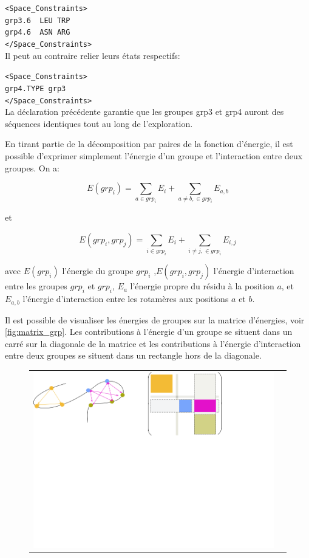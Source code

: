 \begin{enumerate}
\verb!<Space_Constraints>! \\
\verb!grp3.6  LEU TRP! \\
\verb!grp4.6  ASN ARG!  \\
\verb!</Space_Constraints>! \\

Il peut au contraire relier leurs états respectifs:

\verb!<Space_Constraints>! \\
\verb!grp4.TYPE grp3! \\
\verb!</Space_Constraints>! \\

La déclaration précédente garantie que les groupes grp3 et grp4 auront des séquences identiques tout au long de l'exploration. 

En tirant partie de la décomposition par paires de la fonction d'énergie, il est possible d'exprimer simplement l'énergie d'un groupe et l'interaction entre deux groupes. On a:

\begin{equation}
E(grp_i) = \sum_{a \in grp_i} E_i + \sum_{a \neq b, \in grp_i} E_{a,b}
\end{equation}

et

\begin{equation}
E(grp_i,grp_j) = \sum_{i \in grp_i} E_i + \sum_{i \neq j, \in grp_i} E_{i,j}
\end{equation}


avec $E(grp_i)$ l'énergie du groupe $grp_i$ ,$E(grp_i,grp_j)$ l'énergie d'interaction entre les groupes $grp_i$ et $grp_i$, $E_a$ l'énergie propre du résidu à la position $a$, et $E_{a,b}$ l'énergie d'interaction entre les rotamères aux positions $a$ et $b$.

Il est possible de visualiser les énergies de groupes sur la matrice d'énergies, voir \ref{fig:matrix_grp}. Les contributions à l'énergie d'un groupe se situent dans un carré sur la diagonale de la matrice et les contributions à l'énergie d'interaction entre deux groupes se situent dans un rectangle hors de la diagonale.


   \begin{figure}[!htbp]
     \centering
     \begin{tabular}{cc}
       \includegraphics[width=12cm]{figure/grp_matrix.png} &
     \end{tabular}
     

\end{figure}
\end{enumerate}
